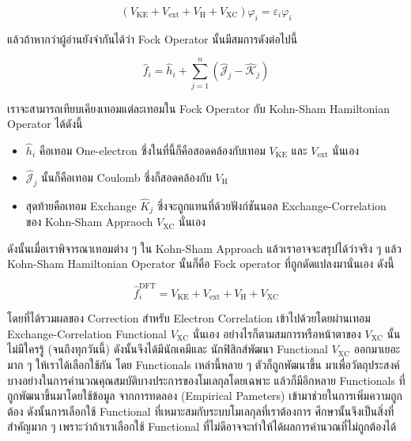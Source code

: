 \begin{equation}
    \label{eq:Kohn_Sham_Equation}
    \left(V_{\mathrm{KE}}+V_{\mathrm{ext}}+V_{\mathrm{H}}+V_{\mathrm{XC}}\right) \varphi_i 
    = \varepsilon_i \varphi_i
\end{equation}

\noindent แล้วถ้าหากว่าผู้อ่านยังจำกันได้ว่า Fock Operator นั้นมีสมการดังต่อไปนี้

\begin{equation}
    \hat{f}_i = \hat{h}_i+\sum_{j=1}^n\left(\hat{\mathscr{J}}_j-\hat{\mathscr{K}}_j\right)
\end{equation}

\noindent เราจะสามารถเทียบเคียงเทอมแต่ละเทอมใน Fock Operator กับ Kohn-Sham Hamiltonian Operator ได้ดังนี้ 

\begin{itemize}
    \item $\hat{h}_i$ คือเทอม One-electron ซึ่งในที่นี้ก็คือสอดคล้องกับเทอม $V_{\mathrm{KE}}$ และ $V_{\mathrm{ext}}$ นั่นเอง 
    
    \item $\hat{\mathcal{J}}_j$ นั้นก็คือเทอม Coulomb ซึ่งก็สอดคล้องกับ $V_{\mathrm{H}}$ 
    
    \item สุดท้ายคือเทอม Exchange $\hat{K}_j$ ซึ่งจะถูกแทนที่ด้วยฟังก์ชันนอล Exchange-Correlation ของ Kohn-Sham Appraoch 
    $V_{\mathrm{XC}}$ นั่นเอง 
\end{itemize}

ดังนั้นเมื่อเราพิจารณาเทอมต่าง ๆ ใน Kohn-Sham Approach แล้วเราอาจจะสรุปได้ว่าจริง ๆ แล้ว Kohn-Sham Hamiltonian Operator นั้นก็คือ 
Fock operator ที่ถูกดัดแปลงมานั่นเอง ดังนี้

\begin{equation}
    \hat{f}_i^{\mathrm{DFT}} 
    = V_{\mathrm{KE}}+V_{\mathrm{ext}}+V_{\mathrm{H}}+V_{\mathrm{XC}}
\end{equation}

\noindent โดยที่ได้รวมผลของ Correction สำหรับ Electron Correlation เข้าไปด้วยโดยผ่านเทอม Exchange-Correlation Functional 
$V_{\mathrm{XC}}$ นั่นเอง อย่างไรก็ตามสมการหรือหน้าตาของ $V_{\mathrm{XC}}$ นั้นไม่มีใครรู้ (จนถึงทุกวันนี้) ดังนั้นจึงได้มีนักเคมีและ%
นักฟิสิกส์พัฒนา Functional $V_{\mathrm{XC}}$ ออกมาเยอะมาก ๆ ให้เราได้เลือกใช้กัน โดย Functionals เหล่านี้หลาย ๆ ตัวก็ถูกพัฒนาขึ้น%
มาเพื่อวัตถุประสงค์บางอย่างในการคำนวณคุณสมบัติบางประการของโมเลกุลโดยเฉพาะ แล้วก็มีอีกหลาย Functionals ที่ถูกพัฒนาขึ้นมาโดยใช้ข้อมูล%
จากการทดลอง (Empirical Pameters) เข้ามาช่วยในการเพิ่มความถูกต้อง ดังนั้นการเลือกใช้ Functional ที่เหมาะสมกับระบบโมเลกุลที่เราต้องการ%
ศึกษานั้นจึงเป็นสิ่งที่สำคัญมาก ๆ เพราะว่าถ้าเราเลือกใช้ Functional ที่ไม่ดีอาจจะทำให้ได้ผลการคำนวณที่ไม่ถูกต้องได้

